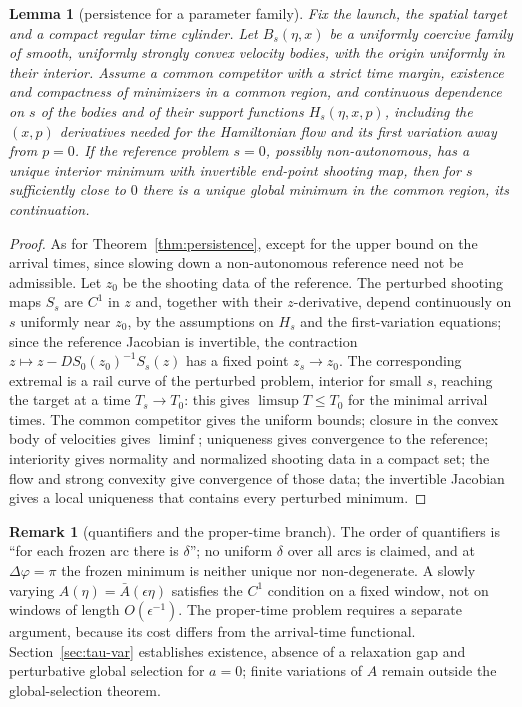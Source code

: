 \documentclass[aip,jmp,amsmath,amssymb,reprint]{revtex4-2}
\theoremstyle{plain}
\newtheorem{lemma}[proposition]{Lemma}
\theoremstyle{definition}
\newtheorem{remark}[proposition]{Remark}
\begin{document}
\begin{lemma}[persistence for a parameter family]\label{rmk:general-parameter}
Fix the launch, the spatial target and a compact regular time cylinder. Let $B_s(\eta,x)$ be a
uniformly coercive family of smooth, uniformly strongly convex velocity bodies, with the
origin uniformly in their interior. Assume a common competitor with a strict time margin,
existence and compactness of minimizers in a common region, and continuous dependence on $s$
of the bodies and of their support functions $H_s(\eta,x,p)$, including the $(x,p)$
derivatives needed for the Hamiltonian flow and its first variation away from $p=0$. If the
reference problem $s=0$, possibly non-autonomous, has a unique interior minimum with
invertible end-point shooting map, then for $s$ sufficiently close to $0$ there is a unique
global minimum in the common region, its continuation.
\end{lemma}

\begin{proof}
As for Theorem~\ref{thm:persistence}, except for the upper bound on the arrival times, since slowing down a
non-autonomous reference need not be admissible. Let $z_0$ be the shooting data of the reference. The perturbed
shooting maps $S_s$ are $C^1$ in $z$ and, together with their $z$-derivative, depend continuously on $s$ uniformly
near $z_0$, by the assumptions on $H_s$ and the first-variation equations; since the reference Jacobian is invertible,
the contraction $z\mapsto z-DS_0(z_0)^{-1}S_s(z)$ has a fixed point $z_s\to z_0$. The corresponding extremal is a rail
curve of the perturbed problem, interior for small $s$, reaching the target at a time $T_s\to T_0$: this gives
$\limsup T\le T_0$ for the minimal arrival times. The common competitor gives the uniform bounds; closure in the
convex body of velocities gives $\liminf$; uniqueness gives
convergence to the reference; interiority gives normality and normalized shooting data in a
compact set; the flow and strong convexity give convergence of those data; the invertible
Jacobian gives a local uniqueness that contains every perturbed minimum.
\end{proof}

\begin{remark}[quantifiers and the proper-time branch]
The order of quantifiers is ``for each frozen arc there is $\delta$''; no uniform $\delta$
over all arcs is claimed, and at $\Delta\varphi=\pi$ the frozen minimum is neither unique
nor non-degenerate. A slowly varying $A(\eta)=\bar A(\epsilon\eta)$ satisfies the $C^1$
condition on a fixed window, not on windows of length $O(\epsilon^{-1})$. The proper-time
problem requires a separate argument, because its cost differs from the arrival-time
functional. Section~\ref{sec:tau-var} establishes existence, absence of a relaxation gap and
perturbative global selection for $a=0$; finite variations of $A$ remain outside the
global-selection theorem.
\end{remark}
\end{document}
